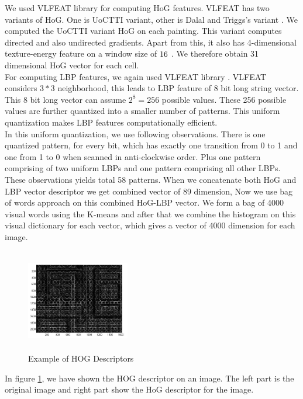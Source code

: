 We used VLFEAT \cite{vlfeat} library for computing HoG features. VLFEAT has two variants of HoG. One is UoCTTI variant, other is Dalal and Triggs's variant \cite{HOG}. We computed the UoCTTI variant HoG on each painting. This variant computes directed and also undirected gradients. Apart from this, it also has 4-dimensional texture-energy feature on a window size of $16 \time 16$ . We therefore obtain 31 dimensional HoG vector for each cell. \\
 For computing LBP features, we again used VLFEAT library \cite{vlfeat}.  VLFEAT considers $3*3$ neighborhood, this leads to LBP feature of 8 bit long string vector. This 8 bit long vector can assume $2^8 = 256$ possible values. These 256 possible values are further quantized into a smaller number of patterns. This uniform quantization makes LBP features computationally efficient. \\
 In this uniform quantization, we use following observations. There is one quantized pattern, for every bit, which has exactly one transition from 0 to 1 and one from 1 to 0 when scanned in anti-clockwise order. Plus one pattern comprising of two uniform LBPs and one pattern comprising all other LBPs. These observations yields total 58 patterns. When we concatenate both HoG and LBP vector descriptor we get combined vector of 89 dimension, Now we use bag of words approach on this combined HoG-LBP vector. We form a bag of 4000 visual words using the K-means and after that we combine the histogram on this visual dictionary for each vector, which gives a vector of 4000 dimension for each image.
 \begin{center}
\begin{figure}
\centering
\includegraphics[width=4.5cm, height=4.5cm]{./Pictures/HOG/hogFeatures.jpg}
\caption{Example of HOG Descriptors}
\label{fig:hogExample}
\end{figure}
\end{center}
 In figure \ref{fig:hogExample}, we have  shown the HOG descriptor on an image. The left part is the original image and right part show the HoG descriptor for the image.
 


